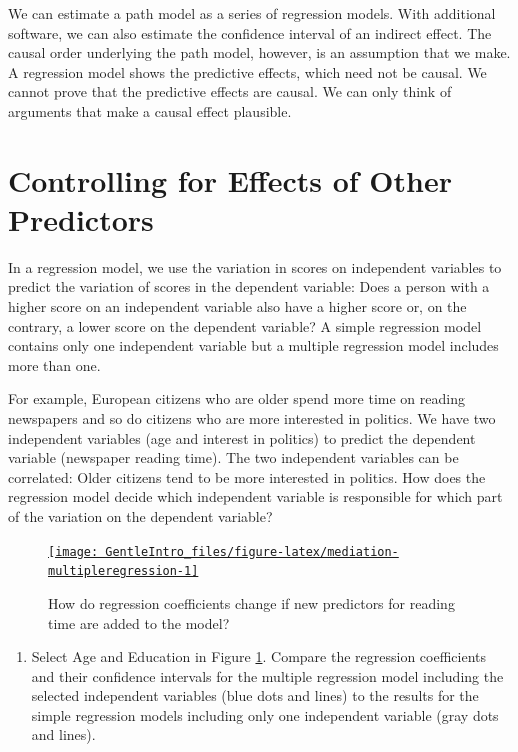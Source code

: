 \documentclass[a4paper]{book}
\providecommand{\tightlist}{%
  \setlength{\itemsep}{0pt}\setlength{\parskip}{0pt}}
\theoremstyle{definition}
\theoremstyle{definition}
\theoremstyle{definition}
\theoremstyle{remark}
\begin{document}
We can estimate a path model as a series of regression models. With
additional software, we can also estimate the confidence interval of an
indirect effect. The causal order underlying the path model, however, is
an assumption that we make. A regression model shows the predictive
effects, which need not be causal. We cannot prove that the predictive
effects are causal. We can only think of arguments that make a causal
effect plausible.

\section{Controlling for Effects of Other Predictors}\label{controlling}

In a regression model, we use the variation in scores on independent
variables to predict the variation of scores in the dependent variable:
Does a person with a higher score on an independent variable also have a
higher score or, on the contrary, a lower score on the dependent
variable? A simple regression model contains only one independent
variable but a multiple regression model includes more than one.

For example, European citizens who are older spend more time on reading
newspapers and so do citizens who are more interested in politics. We
have two independent variables (age and interest in politics) to predict
the dependent variable (newspaper reading time). The two independent
variables can be correlated: Older citizens tend to be more interested
in politics. How does the regression model decide which independent
variable is responsible for which part of the variation on the dependent
variable?

\begin{figure}[H]
\href{http://82.196.4.233:3838/apps/mediation-multipleregression/}{\texttt{[image: GentleIntro\_files/figure-latex/mediation-multipleregression-1]} }\caption{How do regression coefficients change if new predictors for reading time are added to the model?}\label{fig:mediation-multipleregression}
\end{figure}

\begin{enumerate}
\def\labelenumi{\arabic{enumi}.}
\tightlist
\item
  Select Age and Education in Figure
  \ref{fig:mediation-multipleregression}. Compare the regression
  coefficients and their confidence intervals for the multiple
  regression model including the selected independent variables (blue
  dots and lines) to the results for the simple regression models
  including only one independent variable (gray dots and lines).
\end{enumerate}
\end{document}

